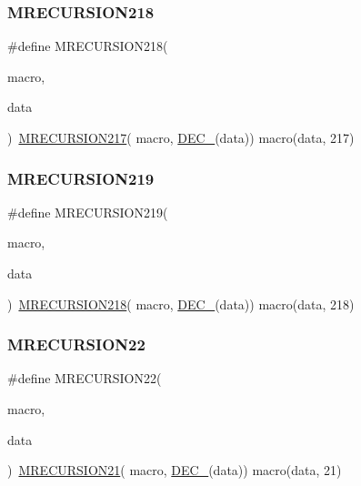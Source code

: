 \subsubsection{\texorpdfstring{MRECURSION218}{MRECURSION218}}
{\footnotesize\ttfamily \#define M\+R\+E\+C\+U\+R\+S\+I\+O\+N218(\begin{DoxyParamCaption}\item[{}]{macro,  }\item[{}]{data }\end{DoxyParamCaption})~\mbox{\hyperlink{group__group__sam0__utils__mrecursion_ga833c81184ac65b08f60d98bf30ff1cfb}{M\+R\+E\+C\+U\+R\+S\+I\+O\+N217}}(  macro, \mbox{\hyperlink{group__group__sam0__utils__mrecursion_ga1d23d683797679dca8c3512a54a5dcae}{D\+E\+C\+\_\+}}(data))   macro(data, 217)}

\mbox{\label{group__group__sam0__utils__mrecursion_ga2a11a726d4daa1ad0ef13baafa4a12c1}} 
\subsubsection{\texorpdfstring{MRECURSION219}{MRECURSION219}}
{\footnotesize\ttfamily \#define M\+R\+E\+C\+U\+R\+S\+I\+O\+N219(\begin{DoxyParamCaption}\item[{}]{macro,  }\item[{}]{data }\end{DoxyParamCaption})~\mbox{\hyperlink{group__group__sam0__utils__mrecursion_ga0cd77c09c29f7703306e2baa29d6e6c2}{M\+R\+E\+C\+U\+R\+S\+I\+O\+N218}}(  macro, \mbox{\hyperlink{group__group__sam0__utils__mrecursion_ga1d23d683797679dca8c3512a54a5dcae}{D\+E\+C\+\_\+}}(data))   macro(data, 218)}

\mbox{\label{group__group__sam0__utils__mrecursion_gaae9d51e102fe3731e303a6142f0a61c7}} 
\subsubsection{\texorpdfstring{MRECURSION22}{MRECURSION22}}
{\footnotesize\ttfamily \#define M\+R\+E\+C\+U\+R\+S\+I\+O\+N22(\begin{DoxyParamCaption}\item[{}]{macro,  }\item[{}]{data }\end{DoxyParamCaption})~\mbox{\hyperlink{group__group__sam0__utils__mrecursion_ga077fdbda319ee988c77241afa1ff82f9}{M\+R\+E\+C\+U\+R\+S\+I\+O\+N21}}(  macro, \mbox{\hyperlink{group__group__sam0__utils__mrecursion_ga1d23d683797679dca8c3512a54a5dcae}{D\+E\+C\+\_\+}}(data))   macro(data, 21)}

